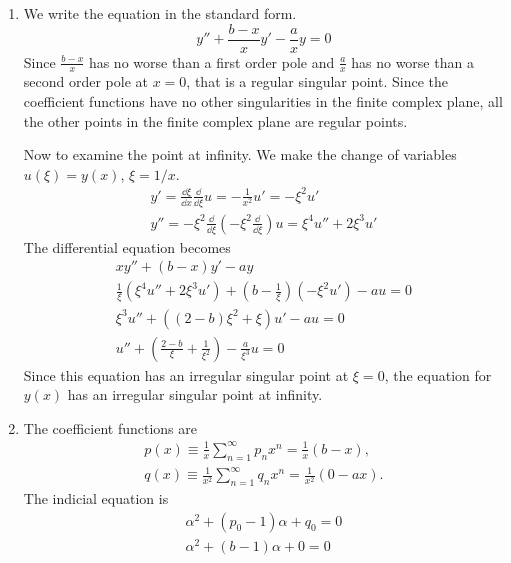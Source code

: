 {%
\begin{Solution}
  \label{solution xybxyay=0}
  \begin{enumerate}
  \item
    We write the equation in the standard form.
    \[
    y'' + \frac{b - x}{x} y' - \frac{a}{x} y = 0
    \]
    Since $\frac{b-x}{x}$ has no worse than a first order pole and $\frac{a}{x}$
    has no worse than a second order pole at $x = 0$, that is a regular 
    singular point.  Since the coefficient functions have no other singularities
    in the finite complex plane, all the other points in the finite complex
    plane are regular points.

    Now to examine the point at infinity.  We make the change of variables
    $u(\xi) = y(x)$, $\xi = 1/x$.
    \begin{gather*}
      y' = \frac{\dd \xi}{\dd x} \frac{\dd}{\dd \xi} u = - \frac{1}{x^2} u' = -\xi^2 u' \\
      y'' = - \xi^2 \frac{\dd}{\dd \xi} \left( -\xi^2 \frac{\dd}{\dd \xi} \right) u
      = \xi^4 u'' + 2 \xi^3 u'
    \end{gather*}
    The differential equation becomes
    \begin{gather*}
      x y'' + (b - x) y' - a y \\
      \frac{1}{\xi} \left( \xi^4 u'' + 2 \xi^3 u' \right) + 
      \left( b - \frac{1}{\xi} \right) \left( - \xi^2 u' \right) - a u = 0 \\
      \xi^3 u'' + \left( (2 - b) \xi^2 + \xi \right) u' - a u = 0 \\
      u'' + \left( \frac{2-b}{\xi} + \frac{1}{\xi^2} \right) - \frac{a}{\xi^3} u = 0
    \end{gather*}
    Since this equation has an irregular singular point at $\xi = 0$, the equation
    for $y(x)$ has an irregular singular point at infinity.
  \item
    The coefficient functions are
    \begin{gather*}
      p(x) \equiv \frac{1}{x} \sum_{n=1}^\infty p_n x^n = \frac{1}{x} (b - x), \\
      q(x) \equiv \frac{1}{x^2} \sum_{n=1}^\infty q_n x^n = \frac{1}{x^2} (0 - a x).
    \end{gather*}
    The indicial equation is
    \begin{gather*}
      \alpha^2 + (p_0 - 1) \alpha + q_0 = 0 \\
      \alpha^2 + (b - 1) \alpha + 0 = 0 \\

\end{gather*}
\end{enumerate}
\end{Solution}}
